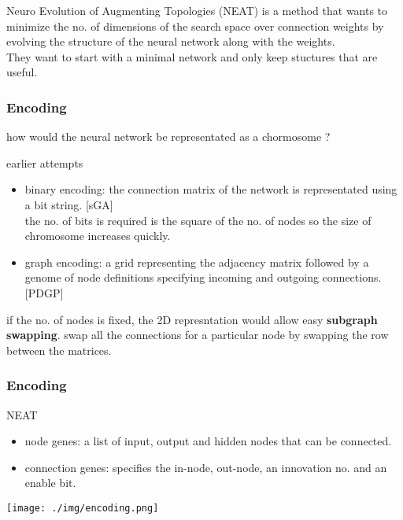 \documentclass{beamer}
\begin{document}
\begin{frame}
Neuro Evolution of Augmenting Topologies (NEAT) is a method that wants to minimize the no. of dimensions of the search space over connection weights by evolving the structure of the neural network along with the weights.\\They want to start with a minimal network and only keep stuctures that are useful.
\end{frame}


\begin{frame}
\frametitle{Encoding}
how would the neural network be representated as a chormosome ?
\begin{block}{earlier attempts}
\begin{itemize}
  \item binary encoding: the connection matrix of the network is representated using a bit string. {[sGA]}\\the no. of bits is required is the square of the no. of nodes so the size of chromosome increases quickly.
  \item graph encoding: a grid representing the adjacency matrix followed by a genome of node definitions specifying incoming and outgoing connections. {[PDGP]}
\end{itemize}
if the no. of nodes is fixed, the 2D represntation would allow easy \textbf{subgraph swapping}. swap all the connections for a particular node by swapping the row between the matrices.
\end{block}
\end{frame}

\begin{frame}
\frametitle{Encoding}
\begin{block}{NEAT}
\begin{itemize}
  \item node genes: a list of input, output and hidden nodes that can be connected.
  \item connection genes: specifies the in-node, out-node, an innovation no. and an enable bit.
\end{itemize}
\end{block}
\texttt{[image: ./img/encoding.png]}
\end{frame}
\end{document}
